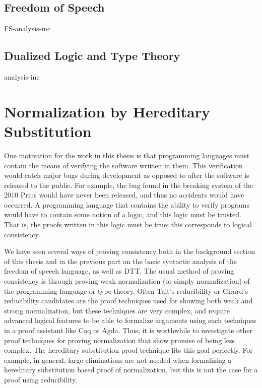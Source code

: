 \documentclass[phd,appendix,dedicationpage,ackpage,epigraphpage]{uithesis}
\begin{document}
\chapter{Freedom of Speech}
\label{chap:freedom_of_speech_anal}
{FS-analysis-inc}

\chapter{Dualized Logic and Type Theory}
\label{chap:dualized_type_theory_anal}
{analysis-inc}

\part{Normalization by Hereditary Substitution}
\label{part:norm-hs}

One motivation for the work in this thesis is that programming
languages must contain the means of verifying the software written in
them.  This verification would catch major bugs during development as
opposed to after the software is released to the public.  For example,
the bug found in the breaking system of the 2010 Prius would have
never been released, and thus no accidents would have occurred.  A
programming language that contains the ability to verify programs
would have to contain some notion of a logic, and this logic must be
trusted.  That is, the proofs written in this logic must be true; this
corresponds to logical consistency.

We have seen several ways of proving consistency both in the
background section of this thesis and in the previous part on the
basic syntactic analysis of the freedom of speech language, as well as
DTT.  The usual method of proving consistency is through proving weak
normalization (or simply normalization) of the programming language or
type theory.  Often Tait's reducibility or Girard's reducibility
candidates are the proof techniques used for showing both weak and
strong normalization, but these techniques are very complex, and
require advanced logical features to be able to formalize arguments
using such techniques in a proof assistant like Coq or Agda.  Thus, it
is worthwhile to investigate other proof techniques for proving
normalization that show promise of being less complex.  The hereditary
substitution proof technique fits this goal perfectly.  For example,
in general, large eliminations are not needed when formalizing a
hereditary substitution based proof of normalization, but this is not
the case for a proof using reducibility.
\end{document}
